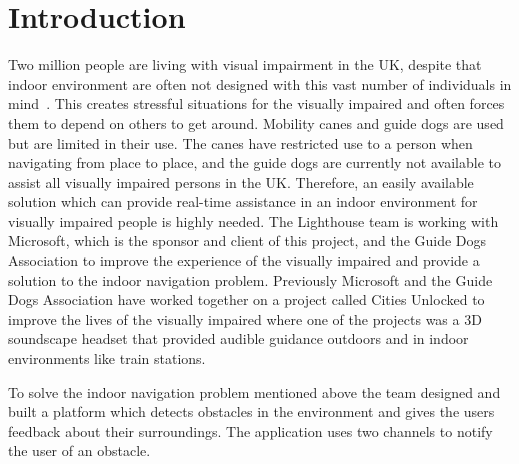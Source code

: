 \documentclass[prodmode,acmtosem]{acmsmall} %
\begin{document}



\maketitle

\section{Introduction}

Two million people are living with visual impairment in the UK, despite that indoor environment are often not designed with this vast number of individuals in mind~\cite{NHSBlindStatistics}. This creates stressful situations for the visually impaired and often forces them to depend on others to get around. Mobility canes and guide dogs are used but are limited in their use. The canes have restricted use to a person when navigating from place to place, and the guide dogs are currently not available to assist all visually impaired persons in the UK. Therefore, an easily available solution which can provide real-time assistance in an indoor environment for visually impaired people is highly needed. 
The Lighthouse team is working with Microsoft, which is the sponsor and client of this project, and the Guide Dogs Association to improve the experience of the visually impaired and provide a solution to the indoor navigation problem. Previously Microsoft and the Guide Dogs Association have worked together on a project called Cities Unlocked to improve the lives of the visually impaired where one of the projects was a 3D soundscape headset that provided audible guidance outdoors and in indoor environments like train stations.

To solve the indoor navigation problem mentioned above the team designed and built a platform which detects obstacles in the environment and gives the users feedback about their surroundings. The application uses two channels to notify the user of an obstacle.
\end{document}
